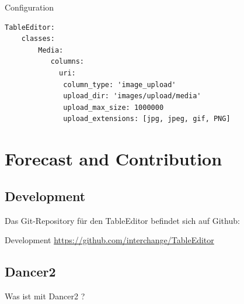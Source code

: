 \begin{frame}[fragile]{Configuration}
\begin{lstlisting}
TableEditor:
    classes:
        Media:
           columns: 
             uri:
              column_type: 'image_upload'
              upload_dir: 'images/upload/media'
              upload_max_size: 1000000
              upload_extensions: [jpg, jpeg, gif, PNG]
\end{lstlisting}
\end{frame}



\section{Forecast and Contribution}

\subsection{Development}

Das Git-Repository für den TableEditor befindet sich auf Github:

\begin{frame}{Development}
\url{https://github.com/interchange/TableEditor}
\end{frame}

\subsection{Dancer2}

Was ist mit Dancer2 ?

